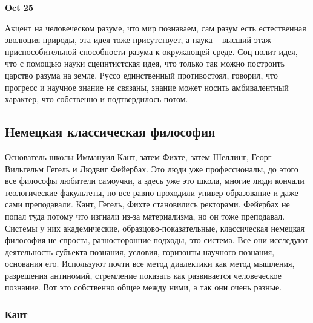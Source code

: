 \documentclass[a4paper, 12pt]{article}
\begin{document}
\hfill\textbf{Oct 25}

Акцент на человеческом разуме, что мир познаваем, сам разум есть 
естественная эволюция природы, эта идея тоже присутствует, а наука -- 
высший этаж приспособительной способности разума к окружающей среде. Соц 
полит идея, что с помощью науки сцеинтистская идея, что только так можно 
построить царство разума на земле. Руссо единственный противостоял, 
говорил, что прогресс и научное знание не связаны, знание может носить 
амбивалентный характер, что собственно и подтвердилось потом.


\subsection{Немецкая классическая философия}

Основатель школы Иммануил Кант, затем Фихте, затем Шеллинг, Георг 
Вильгельм Гегель и Людвиг Фейербах. Это люди уже профессионалы, до этого 
все философы любители самоучки, а здесь уже это школа, многие люди 
кончали теологические факультеты, но все равно проходили универ 
образование и даже сами преподавали. Кант, Гегель, Фихте становились 
ректорами. Фейербах не попал туда потому что изгнали из-за материализма, 
но он тоже преподавал. Системы у них академические, 
образцово-показательные, классическая немецкая философия не спроста, 
разносторонние подходы, это система. Все они исследуют деятельность 
субъекта познания, условия, горизонты научного познания, основания его. 
Используют почти все метод диалектики как метод мышления, разрешения 
антиномий, стремление показать как развивается человеческое познание. 
Вот это собственно общее между ними, а так они очень разные.


\subsubsection{Кант}
\end{document}
